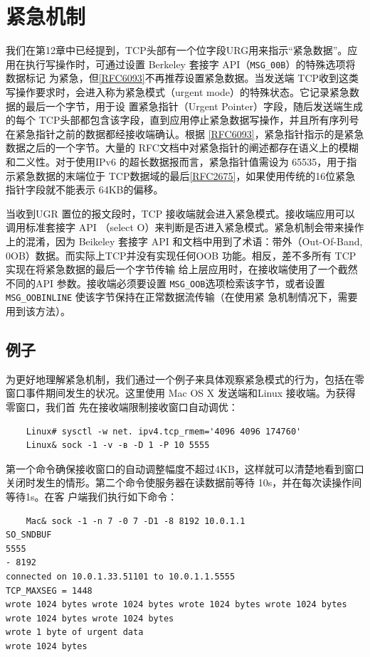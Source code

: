 \section{紧急机制}
我们在第12章中已经提到，TCP头部有一个位字段URG用来指示“紧急数据”。应用在执行写操作时，可通过设置 Berkeley 套接字 API（\verb|MSG_00B|）的特殊选项将数据标记
为紧急，但\href{https://www.rfc-editor.org/rfc/rfc6093}{[RFC6093]}不再推荐设置紧急数据。当发送端 TCP收到这类写操作要求时，会进入称为紧急模式（urgent mode）的特殊状态。它记录紧急数据的最后一个字节，用于设
置紧急指针（Urgent Pointer）字段，随后发送端生成的每个 TCP头部都包含该字段，直到应用停止紧急数据写操作，并且所有序列号在紧急指针之前的数据都经接收端确认。根据
\href{https://www.rfc-editor.org/rfc/rfc6093}{[RFC6093]}，紧急指针指示的是紧急数据之后的一个字节。大量的 RFC文档中对紧急指针的阐述都存在语义上的模糊和二义性。对于使用IPv6 的超长数据报而言，紧急指针值需设为
65535，用于指示紧急数据的末端位于 TCP数据域的最后\href{https://www.rfc-editor.org/rfc/rfc2675}{[RFC2675]}，如果使用传统的16位紧急指针字段就不能表示 64KB的偏移。

当收到UGR 置位的报文段时，TCP 接收端就会进入紧急模式。接收端应用可以调用标准套接字 API （select O）来判断是否进入紧急模式。紧急机制会带来操作上的混淆，因为
Beikeley 套接字 API 和文档中用到了术语：带外（Out-Of-Band, 0OB）数据。而实际上TCP并没有实现任何OOB 功能。相反，差不多所有 TCP实现在将紧急数据的最后一个字节传输
给上层应用时，在接收端使用了一个截然不同的API 参数。接收端必须要设置 \verb|MSG_OOB|选项检索该字节，或者设置 \verb|MSG_OOBINLINE| 使该字节保持在正常数据流传输（在使用紧
急机制情况下，需要用到该方法）。

\subsection{例子}
为更好地理解紧急机制，我们通过一个例子来具体观察紧急模式的行为，包括在零窗口事件期间发生的状况。这里使用 Mac OS X 发送端和Linux 接收端。为获得零窗口，我们首
先在接收端限制接收窗口自动调优：

\begin{verbatim}
    Linux# sysctl -w net. ipv4.tcp_rmem='4096 4096 174760'
    Linux& sock -1 -v -в -D 1 -P 10 5555
\end{verbatim}

第一个命令确保接收窗口的自动调整幅度不超过4KB，这样就可以清楚地看到窗口关闭时发生的情形。第二个命令使服务器在读数据前等待 10s，并在每次读操作间等待1s。在客
户端我们执行如下命令：
\begin{verbatim}
    Mac& sock -1 -n 7 -0 7 -D1 -8 8192 10.0.1.1
SO_SNDBUF
5555
- 8192
connected on 10.0.1.33.51101 to 10.0.1.1.5555
TCP_MAXSEG = 1448
wrote 1024 bytes wrote 1024 bytes wrote 1024 bytes wrote 1024 bytes wrote 1024 bytes wrote 1024 bytes
wrote 1 byte of urgent data
wrote 1024 bytes
\end{verbatim}

